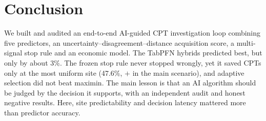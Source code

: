\section{Conclusion}

We built and audited an end-to-end AI-guided CPT investigation loop combining five predictors, an
uncertainty--disagreement--distance acquisition score, a multi-signal stop rule and an economic model. The
TabPFN hybrids predicted best, but only by about 3\%. The frozen stop rule never stopped wrongly, yet it
saved CPTs only at the most uniform site (47.6\%, $+$ in the main scenario), and adaptive
selection did not beat maximin. The main lesson is that an AI algorithm should be judged by the decision it
supports, with an independent audit and honest negative results. Here, site predictability and decision
latency mattered more than predictor accuracy.
